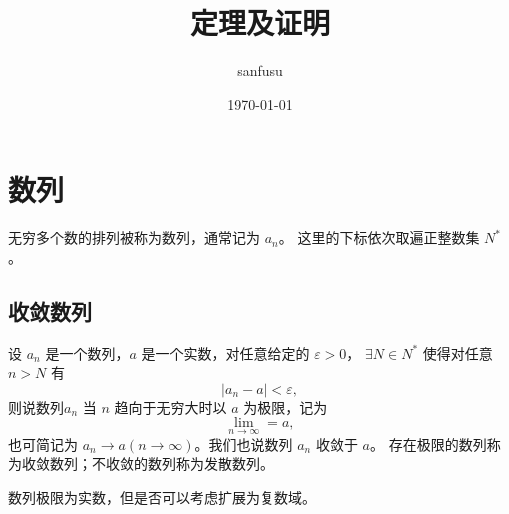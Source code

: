 \documentclass[UTF8]{ctexart}
\begin{document}
    \title{定理及证明}
    \author{sanfusu}
    \date{\today}
    \maketitle

\section{数列}
\begin{Definition}
    无穷多个数的排列被称为数列，通常记为 ${a_n}$。
    这里的下标依次取遍正整数集 $N^*$。
\end{Definition}

\subsection{收敛数列}
\begin{Definition}
    设 ${a_n}$ 是一个数列，$a$ 是一个实数，对任意给定的 $\varepsilon > 0$，
    $\exists N \in N^*$ 使得对任意 $n>N$ 有
    \begin{equation*}
        |a_n-a|<\varepsilon,
    \end{equation*}
    则说数列${a_n}$ 当 $n$ 趋向于无穷大时以 $a$ 为极限，记为
    \begin{equation*}
        \lim_{n\to \infty} = a,
    \end{equation*}
    也可简记为 $a_n \to a (n \to \infty)$。我们也说数列 ${a_n}$ 收敛于 $a$。
    存在极限的数列称为收敛数列；不收敛的数列称为发散数列。
\end{Definition}
\begin{remark}
    数列极限为实数，但是否可以考虑扩展为复数域。
\end{remark}
\end{document}

